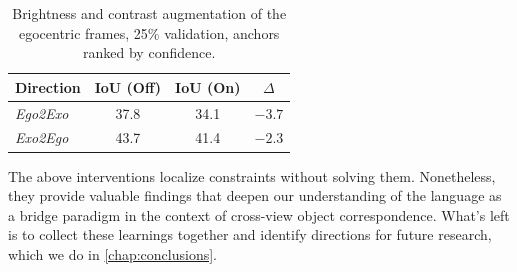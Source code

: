 \begin{table}
  \centering\small
  \setlength{\tabcolsep}{6pt}
  \caption{Brightness and contrast augmentation of the egocentric frames, 25\% validation, anchors ranked by confidence.}
  \label{tab:abl-bright}
  \begin{tabular}{lccc}
  \toprule
  Direction & IoU (Off) & IoU (On) & $\Delta$ \\
  \midrule
  \textit{Ego2Exo} & 37.8 & 34.1 & $-3.7$ \\
  \textit{Exo2Ego} & 43.7 & 41.4 & $-2.3$ \\
  \bottomrule
  \end{tabular}
\end{table}

\vspace{4mm}
The above interventions localize constraints without solving them. Nonetheless, they provide valuable findings that deepen our understanding of the language as a bridge paradigm in the context of cross-view object correspondence. What's left is to collect these learnings together and identify directions for future research, which we do in \cref{chap:conclusions}.